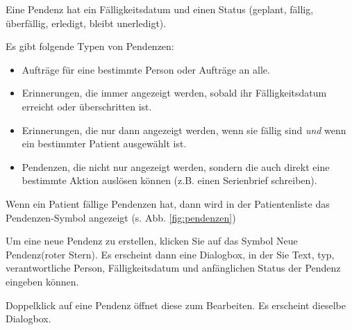 Eine Pendenz hat ein Fälligkeitsdatum und einen Status (geplant, fällig,
überfällig, erledigt, bleibt unerledigt).

Es gibt folgende Typen von Pendenzen:
\begin{itemize}
  \item Aufträge für eine bestimmte Person oder Aufträge an alle.
  \item Erinnerungen, die immer angezeigt werden, sobald ihr Fälligkeitsdatum
  erreicht oder überschritten ist.
  \item Erinnerungen, die nur dann angezeigt werden, wenn sie fällig sind
  \textit{und} wenn ein bestimmter Patient ausgewählt ist.
  \item Pendenzen, die nicht nur angezeigt werden, sondern die auch direkt eine
  bestimmte Aktion auslösen können (z.B. einen Serienbrief schreiben).
\end{itemize}

Wenn ein Patient fällige Pendenzen hat, dann wird in der Patientenliste das
Pendenzen-Symbol angezeigt (s. Abb. \ref{fig:pendenzen})

Um eine neue Pendenz zu erstellen, klicken Sie auf das Symbol \glqq Neue
Pendenz\grqq{}(roter Stern). Es erscheint dann eine Dialogbox, in der Sie Text,
typ, verantwortliche Person, Fälligkeitsdatum und anfänglichen Status der
Pendenz eingeben können.

Doppelklick auf eine Pendenz öffnet diese zum Bearbeiten. Es erscheint dieselbe
Dialogbox.

